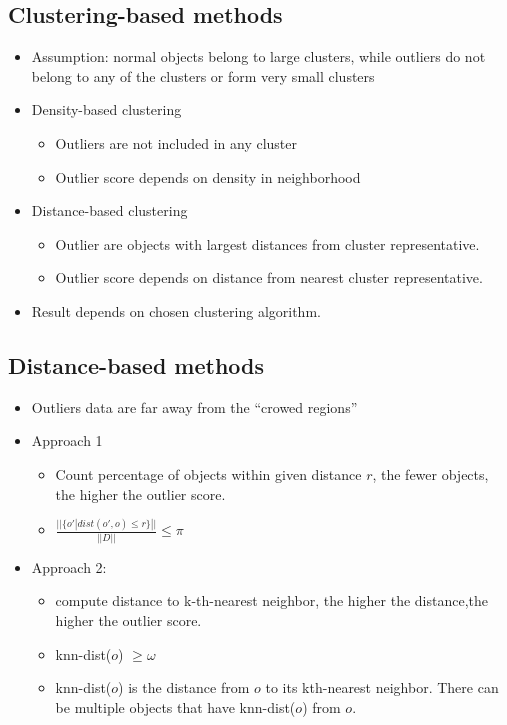 \documentclass[../notes.tex]{subfiles}
\begin{document}
\subsection{Clustering-based methods}
\begin{itemize}
  \item Assumption: normal objects belong to large clusters, while outliers do not belong to any of the clusters or form very small clusters
  
  \item Density-based clustering
  \begin{itemize}
    \item Outliers are not included in any cluster
    \item Outlier score depends on density in neighborhood
  \end{itemize}
  
  \item Distance-based clustering
  \begin{itemize}
    \item Outlier are objects with largest distances from cluster representative.
    \item Outlier score depends on distance from nearest cluster representative.
  \end{itemize}

  \item Result depends on chosen clustering algorithm.
\end{itemize}

\subsection{Distance-based methods}
\begin{itemize}
  \item Outliers data are far away from the ``crowed regions''

  \item Approach 1
  \begin{itemize}
    \item Count percentage of objects within given distance $r$, the fewer objects, the higher the outlier score.
    \item $\frac{||\{o' | dist(o', o) \le r\}||}{||D||} \le \pi$
  \end{itemize}
   
  \item Approach 2: 
  \begin{itemize}
    \item compute distance to k-th-nearest neighbor, the higher the distance,the higher the outlier score.
    \item knn-dist($o$) $\ge \omega$
    \item knn-dist($o$) is the distance from $o$ to its kth-nearest neighbor. There can be multiple objects that have knn-dist($o$) from $o$. 
  \end{itemize}
\end{itemize}
\end{document}
